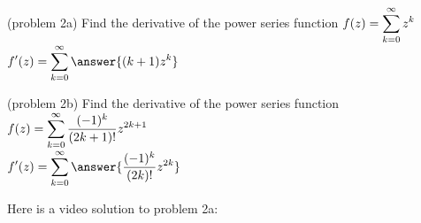 \documentclass[handout]{ximera}
\begin{document}
\begin{problem}(problem 2a)
Find the derivative of the power series function $\displaystyle f(z) = \sum_{k=0}^\infty z^k$\\
$\dis f'(z) = \sum_{k=0}^\infty \answer{(k+1)z^k}$
\end{problem}

\begin{problem}(problem 2b)
Find the derivative of the power series function $\displaystyle f(z) = \sum_{k=0}^\infty \frac{(-1)^k}{(2k+1)!}z^{2k+1}$\\
$\dis f'(z) = \sum_{k=0}^\infty \answer{\frac{(-1)^k}{(2k)!}z^{2k}}$
\end{problem}

Here is a video solution to problem 2a:\\
\begin{foldable}
\end{foldable}
\end{document}
